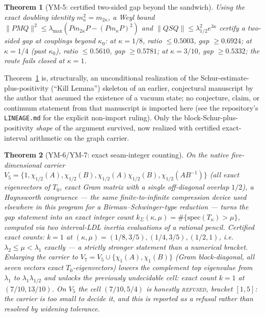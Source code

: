 \documentclass[aps,prd,twocolumn,superscriptaddress,nofootinbib]{revtex4-2}
\newtheorem{theorem}{Theorem}
\begin{document}
\begin{theorem}[YM-5: certified two-sided gap beyond the sandwich]\label{thm:ym5}
Using the exact doubling identity $m_\kappa^2=m_{2\kappa}$, a Weyl
bound $\|PMQ\|^2\le\lambda_{\max}(Pm_{2\kappa}P-(Pm_\kappa P)^2)$ and
$\|QSQ\|\le\lambda_{1/2}^2e^{3\kappa}$ certify a two-sided gap at
couplings beyond $\kappa_0$: at $\kappa=1/8$, ratio $\le0.5003$, gap
$\ge0.6924$; at $\kappa=1/4$ (past $\kappa_0$), ratio $\le0.5610$, gap
$\ge0.5781$; at $\kappa=3/10$, gap $\ge0.5332$; the route fails closed at
$\kappa=1$.
\end{theorem}

Theorem~\ref{thm:ym5} is, structurally, an unconditional realization of
the Schur-estimate-plus-positivity (``Kill Lemma'') skeleton of an
earlier, conjectural manuscript by the author that assumed the existence
of a vacuum state; no conjecture, claim, or continuum statement from that
manuscript is imported here (see the repository's \texttt{LINEAGE.md} for
the explicit non-import ruling). Only the block-Schur-plus-positivity
\emph{shape} of the argument survived, now realized with certified
exact-interval arithmetic on the graph carrier.

\begin{theorem}[YM-6/YM-7: exact seam-integer counting]\label{thm:ym67}
On the native five-dimensional carrier
$V_5=\{1,\chi_{1/2}(A),\chi_{1/2}(B),\chi_{1/2}(A)\chi_{1/2}(B),
\chi_{1/2}(AB^{-1})\}$ (all exact eigenvectors of $T_0$, exact Gram
matrix with a single off-diagonal overlap $1/2$), a Haynsworth
congruence --- the same finite-to-infinite compression device used
elsewhere in this program for a Birman--Schwinger-type reduction ---
turns the gap statement into an \emph{exact integer count}
$k_\Sigma(\kappa,\mu)=\#\{\mathrm{spec}(T_\kappa)>\mu\}$, computed via two
interval-LDL inertia evaluations of a rational pencil. Certified exact
counts: $k=1$ at $(\kappa,\mu)=(1/8,3/5),(1/4,3/5),(1/2,1)$, i.e.\
$\lambda_2\le\mu<\lambda_1$ \emph{exactly} --- a strictly stronger
statement than a numerical bracket. Enlarging the carrier to
$V_7=V_5\cup\{\chi_1(A),\chi_1(B)\}$ (Gram block-diagonal, all seven
vectors exact $T_0$-eigenvectors) lowers the complement top eigenvalue
from $\lambda_1$ to $\lambda_1\lambda_{1/2}$ and unlocks the previously
undecidable cell: exact count $k=1$ at $(7/10,13/10)$. On $V_5$ the cell
$(7/10,5/4)$ is honestly \textsc{refused}, bracket $[1,5]$: the carrier is
too small to decide it, and this is reported as a refusal rather than
resolved by widening tolerance.
\end{theorem}
\end{document}
